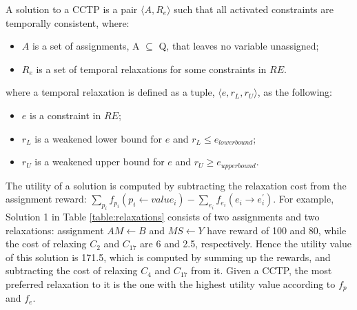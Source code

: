 \documentclass[jair,twoside,11pt,theapa]{article}
\begin{document}
\begin{mydef}
	A solution to a CCTP is a pair $\langle A,R_e\rangle$ such that all activated constraints are temporally consistent, where:
	\begin{itemize}		
		\item $A$ is a set of assignments, A $\subseteq$ Q, that leaves no variable unassigned;
		\item $R_e$ is a set of temporal relaxations for some constraints in $RE$.
	\end{itemize}
\end{mydef}

%
%

where a temporal relaxation is defined as a tuple, $\langle e,r_L,r_U\rangle$, as the following:

\begin{itemize}		
	\item $e$ is a constraint in $RE$;
	
	
	\item $r_L$ is a weakened lower bound for $e$ and $r_L\leq e_{lowerbound}$;
	\item $r_U$ is a weakened upper bound for $e$ and $r_U\geq e_{upperbound}$.
\end{itemize}




The utility of a solution is computed by subtracting the relaxation cost from
the assignment reward: $\sum_{p_i}f_{p_i}(p_i\leftarrow
value_i)-\sum_{e_i}f_{e_i}(e_i\rightarrow e_i^{\prime})$.  For example, Solution
1 in Table \ref{table:relaxations} consists of two assignments and two
relaxations: assignment $AM\leftarrow B$ and $MS\leftarrow Y$ have reward of 100
and 80, while the cost of relaxing $C_2$ and $C_{17}$ are 6 and 2.5,
respectively. Hence the utility value of this solution is 171.5, which is
computed by summing up the rewards, and subtracting the cost of relaxing $C_4$
and $C_{17}$ from it. Given a CCTP, the most preferred relaxation to it is
the one with the highest utility value according to $f_p$ and $f_e$.
\end{document}
